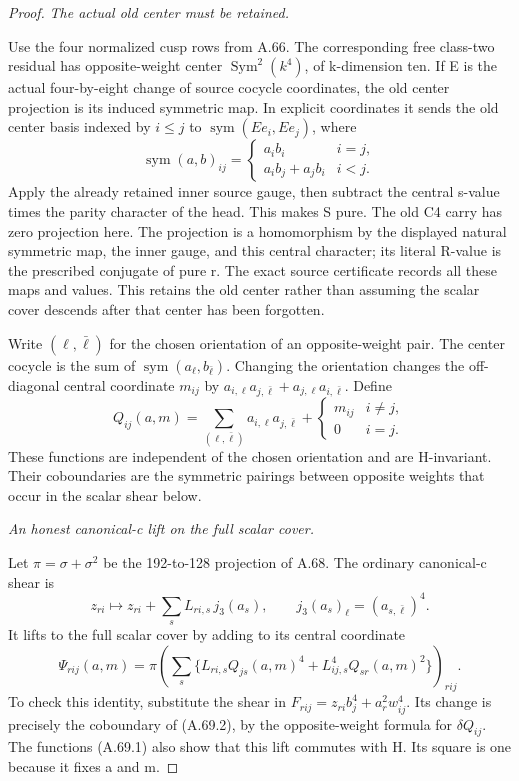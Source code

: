 \begin{proof}
\emph{The actual old center must be retained.}\par
Use the four normalized cusp rows from A.66. The corresponding
free class-two residual has opposite-weight center
\(\operatorname{Sym}^2(k^4)\), of k-dimension ten. If E is
the actual four-by-eight change of source cocycle coordinates,
the old center projection is its induced symmetric map. In explicit
coordinates it sends the old center basis indexed by \(i\leq j\)
to \(\operatorname{sym}(Ee_i,Ee_j)\), where
\[
 \operatorname{sym}(a,b)_{ij}=
 \begin{cases}a_i b_i&i=j,\\
 a_i b_j+a_j b_i&i<j.
 \end{cases}
\]
Apply the already retained inner source gauge, then subtract the
central s-value times the parity character of the head. This
makes S pure. The old C4 carry has zero projection here. The
projection is a homomorphism by the displayed natural symmetric
map, the inner gauge, and this central character; its literal
R-value is the prescribed conjugate of pure r. The exact source
certificate records all these maps and values. This retains the
old center rather than assuming the scalar cover descends after
that center has been forgotten.

Write \((\ell,\bar\ell)\) for the chosen orientation of an
opposite-weight pair. The center cocycle is the sum of
\(\operatorname{sym}(a_\ell,b_{\bar\ell})\).
Changing the orientation changes the off-diagonal central
coordinate \(m_{ij}\) by
\(a_{i,\ell}a_{j,\bar\ell}+a_{j,\ell}a_{i,\bar\ell}\).
Define
\[
 Q_{ij}(a,m)=\sum_{(\ell,\bar\ell)}
                  a_{i,\ell}a_{j,\bar\ell}
              +\begin{cases}m_{ij}&i\ne j,\\0&i=j.\end{cases}
 \tag{A.69.1}
\]
These functions are independent of the chosen orientation and
are H-invariant. Their coboundaries are the symmetric pairings
between opposite weights that occur in the scalar shear below.

\emph{An honest canonical-c lift on the full scalar cover.}\par
Let \(\pi=\sigma+\sigma^2\) be the 192-to-128 projection
of A.68. The ordinary canonical-c shear is
\[
 z_{ri}\longmapsto z_{ri}+
           \sum_sL_{ri,s}\,j_3(a_s),
 \qquad j_3(a_s)_\ell=(a_{s,\bar\ell})^4.
\]
It lifts to the full scalar cover by adding to its central coordinate
\[
 \Psi_{rij}(a,m)=\pi\left(
   \sum_s\{L_{ri,s}Q_{js}(a,m)^4
              +L_{ij,s}^4Q_{sr}(a,m)^2\}\right)_{rij}.
 \tag{A.69.2}
\]
To check this identity, substitute the shear in
\(F_{rij}=z_{ri}b_j^4+a_r^2w_{ij}^4\).
Its change is precisely the coboundary of (A.69.2), by the
opposite-weight formula for \(\delta Q_{ij}\).
The functions (A.69.1) also show that this lift commutes with
H. Its square is one because it fixes a and m.


\end{proof}
